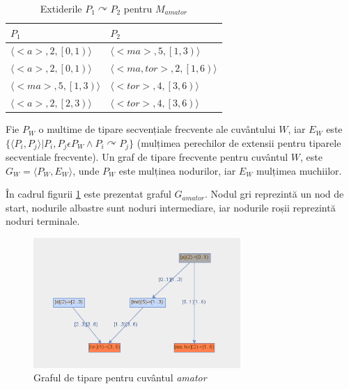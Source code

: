 \begin{table}[h!]
\centering    
\begin{tabular}{|l|l|}    
\hline      
$P_1$ & $P_2$\\
\hline
$\langle<a>, 2, \left[0,1\right)\rangle$ & $\langle<ma>, 5, \left[1,3\right)\rangle$  \\
$\langle<a>, 2, \left[0,1\right)\rangle$ & $\langle<ma,tor>, 2, \left[1,6\right)\rangle$  \\
$\langle<ma>, 5, \left[1,3\right)\rangle$ & $\langle<tor>, 4, \left[3,6\right)\rangle$  \\
$\langle<a>, 2, \left[2,3\right)\rangle$ & $\langle<tor>, 4, \left[3,6\right)\rangle$  \\
\hline
\end{tabular}
\caption{Extiderile $P_1 \curvearrowright P_2$ pentru $M_{amator}$}
\label{table:sdb_pattern_extensions}               
\end{table}  

\begin{defi}
Fie $P_W$ o multime de tipare secvențiale frecvente ale cuvântului $W$, iar $E_W$ este $\{\langle P_i, P_j \rangle \vert P_i,P_j \epsilon P_W \wedge P_i \curvearrowright P_j\}$ (mulțimea perechilor de extensii pentru tiparele secventiale frecvente). Un graf de tipare frecvente pentru cuvântul $W$, este $G_W = \langle P_W, E_W \rangle$, unde $P_W$ este mulținea nodurilor, iar $E_W$ mulțimea muchiilor. 
\end{defi}

\begin{ex}
În cadrul figurii \ref{fig:rosil-amator} este prezentat graful $G_{amator}$. Nodul gri reprezintă un nod de start, nodurile albastre sunt noduri intermediare, iar nodurile roșii reprezintă noduri terminale. 
\end{ex}

\begin{figure}[h!]
    \centering
    \includegraphics[width=0.7\textwidth]{figures/rosil-amator.png}
    \caption{Graful de tipare pentru cuvântul \textit{amator}}
    \label{fig:rosil-amator}
\end{figure}

